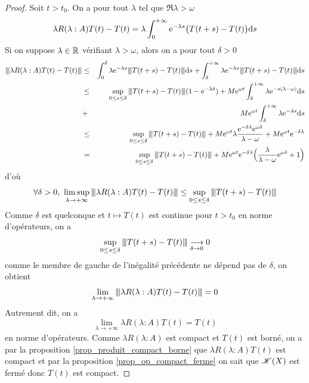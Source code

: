 \begin{proof}
    Soit $t>t_0$. On a pour tout $\lambda$ tel que $\Re \lambda > \omega$
    \begin{equation*}
        \lambda R(\lambda : A)T(t)-T(t) = \lambda \int_0^{+\infty}\mathrm{e}^{-\lambda s}\big(T(t+s)-T(t)\big)\mathrm{d} s
    \end{equation*}
    Si on suppose $\lambda \in \mathbb{R}$ vérifiant $\lambda >\omega$, alors on a pour tout $\delta >0$
    \begin{eqnarray*}
        \vertiii{\lambda R(\lambda : A)T(t)-T(t)} &\leq& \int_0^{\delta} \lambda \ex^{-\lambda s}\vertiii{T(t+s)-T(t)}\d s+\int_{\delta}^{+\infty}\lambda \ex^{-\lambda s}\vertiii{T(t+s)-T(t)}\d s \\
        &\leq& \sup_{0\leq s \leq \delta} \vertiii{T(t+s)-T(t)} (1-\ex^{-\lambda \delta}) + M\ex^{\omega t}\int_{\delta}^{+\infty}\lambda \ex^{-s(\lambda-\omega)}\d s \\
        &+& M\ex^{\omega t}\int_{\delta}^{+\infty}\lambda \ex^{-\lambda s}\d s \\
        &\leq& \sup_{0\leq s \leq \delta} \vertiii{T(t+s)-T(t)}+M\ex^{\omega t}\lambda \frac{\ex^{-\delta \lambda}\ex^{\omega \delta}}{\lambda-\omega} + M\ex^{\omega t}\ex^{-\delta \lambda} \\
        &=& \sup_{0\leq s \leq \delta} \vertiii{T(t+s)-T(t)}+M \ex^{\omega t}\ex^{-\delta \lambda}\Big(\frac{\lambda}{\lambda-\omega}\ex^{\omega \delta}+1\Big)
    \end{eqnarray*}
    d'où 
    \begin{equation*}
        \forall \delta >0, \ \limsup_{\lambda \to +\infty} {\left\vert\kern-0.25ex\left\vert \kern-0.25ex\left\vert \lambda R(\lambda : A)T(t)-T(t) \right\vert\kern-0.25ex\right\vert\kern-0.25ex\right\vert} \leq \sup_{0\leq s \leq \delta} {\left\vert\kern-0.25ex\left\vert \kern-0.25ex\left\vert T(t+s)-T(t) \right\vert\kern-0.25ex\right\vert\kern-0.25ex\right\vert}
    \end{equation*}
    Comme $\delta$ est quelconque et $t \mapsto T(t)$ est continue pour $t>t_0$ en norme d'opérateurs, on a 
    \begin{equation*}
        \sup_{0\leq s \leq \delta} {\left\vert\kern-0.25ex\left\vert \kern-0.25ex\left\vert T(t+s)-T(t) \right\vert\kern-0.25ex\right\vert\kern-0.25ex\right\vert} \underset{\delta \to 0}{\longrightarrow} 0
    \end{equation*}
    comme le membre de gauche de l'inégalité précédente ne dépend pas de $\delta$, on obtient
    \begin{equation*}
        \lim_{\lambda \to +\infty} {\left\vert\kern-0.25ex\left\vert \kern-0.25ex\left\vert \lambda R(\lambda : A)T(t)-T(t) \right\vert\kern-0.25ex\right\vert\kern-0.25ex\right\vert} =0
    \end{equation*}
    Autrement dit, on a 
    \begin{equation*}
        \lim_{\lambda \to +\infty} \lambda R(\lambda : A)T(t)=T(t)
    \end{equation*}
    en norme d'opérateurs. Comme $\lambda R(\lambda : A)$ est compact et $T(t)$ est borné, on a par la proposition \ref{prop_produit_compact_borne} que $\lambda R(\lambda : A)T(t)$ est compact et par la proposition \ref{prop_op_compact_ferme} on sait que $\mathscr{K}(X)$ est fermé donc $T(t)$ est compact.
\end{proof}

